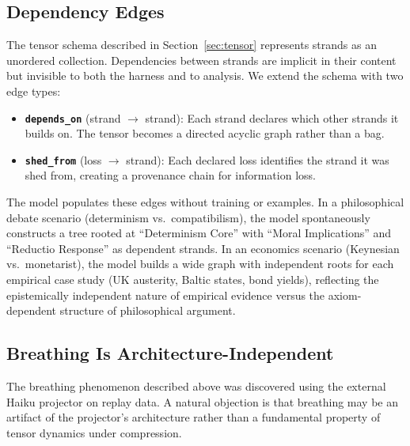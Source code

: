 \subsection{Dependency Edges}
\label{sec:edges}

The tensor schema described in Section~\ref{sec:tensor} represents strands
as an unordered collection. Dependencies between strands are implicit in
their content but invisible to both the harness and to analysis. We extend
the schema with two edge types:

\begin{itemize}
\item \textbf{\texttt{depends\_on}} (strand $\rightarrow$ strand): Each
  strand declares which other strands it builds on. The tensor becomes a
  directed acyclic graph rather than a bag.
\item \textbf{\texttt{shed\_from}} (loss $\rightarrow$ strand): Each
  declared loss identifies the strand it was shed from, creating a
  provenance chain for information loss.
\end{itemize}

The model populates these edges without training or examples. In a
philosophical debate scenario (determinism vs.\ compatibilism), the model
spontaneously constructs a tree rooted at ``Determinism Core'' with
``Moral Implications'' and ``Reductio Response'' as dependent strands.
In an economics scenario (Keynesian vs.\ monetarist), the model builds
a wide graph with independent roots for each empirical case study (UK
austerity, Baltic states, bond yields), reflecting the epistemically
independent nature of empirical evidence versus the axiom-dependent
structure of philosophical argument.



\subsection{Breathing Is Architecture-Independent}
\label{sec:breathing-independence}

The breathing phenomenon described above was discovered using the external
Haiku projector on replay data. A natural objection is that breathing may
be an artifact of the projector's architecture rather than a fundamental
property of tensor dynamics under compression.

